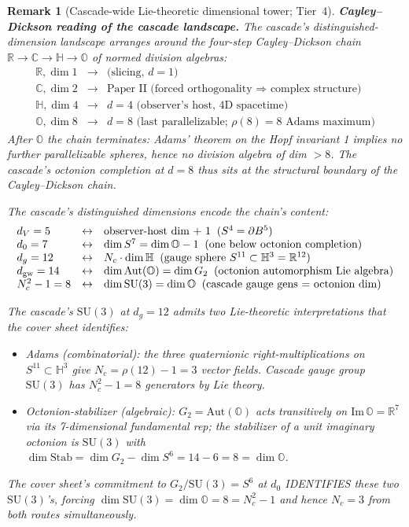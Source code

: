 \documentclass[12pt,a4paper]{article}
\newtheorem*{remark}{Remark}
\begin{document}
\begin{remark}[Cascade-wide Lie-theoretic dimensional tower; Tier~4]
\medskip\noindent\textbf{Cayley--Dickson reading of the cascade landscape.} The cascade's distinguished-dimension landscape arranges around the four-step Cayley--Dickson chain $\mathbb{R}\to\mathbb{C}\to\mathbb{H}\to\mathbb{O}$ of normed division algebras:
\[
\begin{array}{lcl}
\mathbb{R}, \dim 1 & \rightarrow & \text{(slicing, } d=1\text{)} \\
\mathbb{C}, \dim 2 & \rightarrow & \text{Paper~II (forced orthogonality $\Rightarrow$ complex structure)} \\
\mathbb{H}, \dim 4 & \rightarrow & d=4 \text{ (observer's host, 4D spacetime)} \\
\mathbb{O}, \dim 8 & \rightarrow & d=8 \text{ (last parallelizable; } \rho(8)=8\text{ Adams maximum)}
\end{array}
\]
After $\mathbb{O}$ the chain terminates: Adams' theorem on the Hopf invariant 1 implies no further parallelizable spheres, hence no division algebra of dim $> 8$. The cascade's octonion completion at $d=8$ thus sits at the structural boundary of the Cayley--Dickson chain.

The cascade's distinguished dimensions encode the chain's content:
\[
\begin{array}{lcl}
d_V = 5 & \leftrightarrow & \text{observer-host dim + 1} \;\;(S^4 = \partial B^5)\\
d_0 = 7 & \leftrightarrow & \dim S^7 = \dim\mathbb{O} - 1 \;\;(\text{one below octonion completion})\\
d_g = 12 & \leftrightarrow & N_c\cdot\dim\mathbb{H} \;\;(\text{gauge sphere $S^{11}\subset\mathbb{H}^3 = \mathbb{R}^{12}$})\\
d_{\rm gw} = 14 & \leftrightarrow & \dim\mathrm{Aut}(\mathbb{O}) = \dim G_2 \;\;(\text{octonion automorphism Lie algebra})\\
N_c^2 - 1 = 8 & \leftrightarrow & \dim\mathrm{SU}(3) = \dim\mathbb{O} \;\;(\text{cascade gauge gens $=$ octonion dim})
\end{array}
\]

The cascade's $\mathrm{SU}(3)$ at $d_g = 12$ admits two Lie-theoretic interpretations that the cover sheet identifies:
\begin{itemize}[nosep]
\item \emph{Adams (combinatorial):} the three quaternionic right-multiplications on $S^{11}\subset\mathbb{H}^3$ give $N_c = \rho(12)-1 = 3$ vector fields. Cascade gauge group $\mathrm{SU}(3)$ has $N_c^2-1=8$ generators by Lie theory.
\item \emph{Octonion-stabilizer (algebraic):} $G_2 = \mathrm{Aut}(\mathbb{O})$ acts transitively on $\mathrm{Im}\,\mathbb{O} = \mathbb{R}^7$ via its 7-dimensional fundamental rep; the stabilizer of a unit imaginary octonion is $\mathrm{SU}(3)$ with $\dim\mathrm{Stab} = \dim G_2 - \dim S^6 = 14 - 6 = 8 = \dim\mathbb{O}$.
\end{itemize}
The cover sheet's commitment to $G_2/\mathrm{SU}(3) = S^6$ at $d_0$ IDENTIFIES these two $\mathrm{SU}(3)$'s, forcing $\dim\mathrm{SU}(3) = \dim\mathbb{O} = 8 = N_c^2 - 1$ and hence $N_c = 3$ from both routes simultaneously.


\end{remark}
\end{document}
